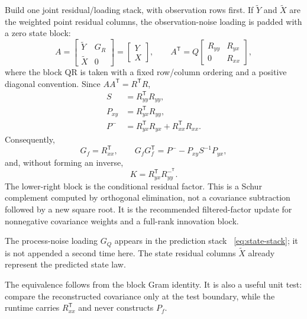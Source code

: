 \documentclass[11pt]{article}
\newcommand{\transpose}{^{\mathsf T}}
\begin{document}
Build one joint residual/loading stack, with observation rows first.  If
$\widetilde Y$ and $\widetilde X$ are the weighted point residual columns,
the observation-noise loading is padded with a zero state block:
\begin{equation}
 A=\left[
 \begin{array}{c|c}
 \widetilde Y & G_R\\
 \widetilde X & 0
 \end{array}\right]
 =\begin{bmatrix}Y\\X\end{bmatrix},
 \qquad A\transpose=Q
 \begin{bmatrix}R_{yy}&R_{yx}\\0&R_{xx}\end{bmatrix},
 \label{eq:block-qr}
\end{equation}
where the block QR is taken with a fixed row/column ordering and a positive
diagonal convention.  Since $A A\transpose=R\transpose R$,
\begin{align}
 S&=R_{yy}\transpose R_{yy},\\
 P_{xy}&=R_{yx}\transpose R_{yy},\\
 P^-&=R_{yx}\transpose R_{yx}+R_{xx}\transpose R_{xx}.
 \label{eq:block-covariance-identities}
\end{align}
Consequently,
\begin{equation}
 G_f=R_{xx}\transpose,
 \qquad G_fG_f\transpose=P^- - P_{xy}S^{-1}P_{yx},
 \label{eq:conditional-factor}
\end{equation}
and, without forming an inverse,
\begin{equation}
 K=R_{yx}\transpose R_{yy}^{-\transpose}.
 \label{eq:block-gain}
\end{equation}
The lower-right block is the conditional residual factor.  This is a Schur
complement computed by orthogonal elimination, not a covariance subtraction
followed by a new square root.  It is the recommended filtered-factor update
for nonnegative covariance weights and a full-rank innovation block.

The process-noise loading $G_Q$ appears in the prediction stack
~\eqref{eq:state-stack}; it is not appended a second time here.  The state
residual columns $\widetilde X$ already represent the predicted state law.

The equivalence follows from the block Gram identity.  It is also a useful unit
test: compare the reconstructed covariance only at the test boundary, while
the runtime carries $R_{xx}\transpose$ and never constructs $P_f$.
\end{document}
